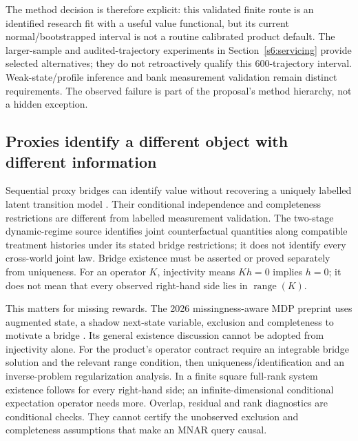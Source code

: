 The method decision is therefore explicit: this validated finite route is
an identified research fit with a useful value functional, but its current
normal/bootstrapped interval is not a routine calibrated product default.
The larger-sample and audited-trajectory experiments in
Section~\ref{s6:servicing} provide selected alternatives; they do not
retroactively qualify this 600-trajectory interval. Weak-state/profile
inference and bank measurement validation remain distinct requirements. The observed
failure is part of the proposal's method hierarchy, not a hidden exception.

\subsection{Proxies identify a different object with different information}
Sequential proxy bridges can identify value without recovering a uniquely
labelled latent transition model \citep{bennettprox2023,zhangprox2024}.
Their conditional independence and completeness restrictions are different
from labelled measurement validation. The two-stage dynamic-regime source
identifies joint counterfactual quantities along compatible treatment
histories under its stated bridge restrictions; it does not identify every
cross-world joint law. Bridge existence must be asserted or proved separately
from uniqueness. For an operator $K$, injectivity means $Kh=0$ implies
$h=0$; it does not mean that every observed right-hand side lies in
$\operatorname{range}(K)$.

This matters for missing rewards. The 2026 missingness-aware MDP preprint
uses augmented state, a shadow next-state variable, exclusion and completeness
to motivate a bridge \citep[Assumptions 3.1--3.4, Theorem 3.6]{wei2026}.
Its general existence discussion cannot be adopted from injectivity alone.
For the product's operator contract require an integrable bridge solution
and the relevant range condition, then uniqueness/identification and an
inverse-problem regularization analysis. In a finite square full-rank system
existence follows for every right-hand side; an infinite-dimensional
conditional expectation operator needs more. Overlap, residual and rank
diagnostics are conditional checks. They cannot certify the unobserved
exclusion and completeness assumptions that make an MNAR query causal.
